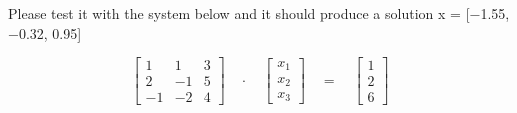 \documentclass[]{article}
\begin{document}
Please test it with the system below and it should produce a solution x
= {[}−1.55, −0.32, 0.95{]}

\[\begin{bmatrix} 1 & 1 & 3 \\ 2 & -1 & 5 \\ -1 & -2 & 4 \end{bmatrix}\quad \cdot \quad \begin{bmatrix} { x }_{ 1 } \\ { x }_{ 2 } \\ { x }_{ 3 } \end{bmatrix}\quad =\quad \begin{bmatrix} 1 \\ 2 \\ 6 \end{bmatrix}\]
\end{document}
